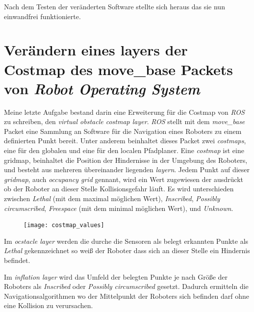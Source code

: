 Nach dem Testen der veränderten Software stellte sich heraus das sie nun einwandfrei funktionierte.

\section{Verändern eines layers der Costmap des move\_base Packets von \emph{Robot Operating System}}

Meine letzte Aufgabe bestand darin eine Erweiterung für die Costmap von \emph{ROS} zu schreiben, den \emph{virtual obstacle costmap layer}.
\emph{ROS} stellt mit dem \emph{move\_base} Packet eine Sammlung an Software für die Navigation eines Roboters zu einem definierten Punkt bereit. Unter anderem beinhaltet dieses Packet zwei \emph{costmaps}, eine für den globalen und eine für den localen Pfadplaner.
Eine \emph{costmap} ist eine \Gls{gridmap}, beinhaltet die Position der Hindernisse in der Umgebung des Roboters, und besteht aus mehreren übereinander liegenden \emph{layern}.
Jedem Punkt auf dieser \emph{gridmap}, auch \emph{occupancy grid} gennant, wird ein Wert zugewiesen der ausdrückt ob der Roboter an dieser Stelle Kollisionsgefahr läuft.
Es wird unterschieden zwischen \emph{Lethal} (mit dem maximal möglichen Wert), \emph{Inscribed}, \emph{Possibly circumscribed}, \emph{Freespace} (mit dem minimal möglichen Wert), und \emph{Unknown}. 

\begin{figure}[ht]
\begin{center}
\texttt{[image: costmap\_values]}
  \label{costmap_values}
\end{center}
\end{figure}

\FloatBarrier

Im \emph{ocstacle layer} werden die durche die Sensoren als belegt erkannten Punkte als \emph{Lethal} gekennzeichnet so weiß der Roboter dass sich an dieser Stelle ein Hindernis befindet.

Im \emph{inflation layer} wird das Umfeld der belegten Punkte je nach Größe der Roboters als \emph{Inscribed} oder \emph{Possibly circumscribed} gesetzt. Dadurch ermitteln die Navigationsalgorithmen wo der Mittelpunkt der Roboters sich befinden darf ohne eine Kollision zu verursachen.


